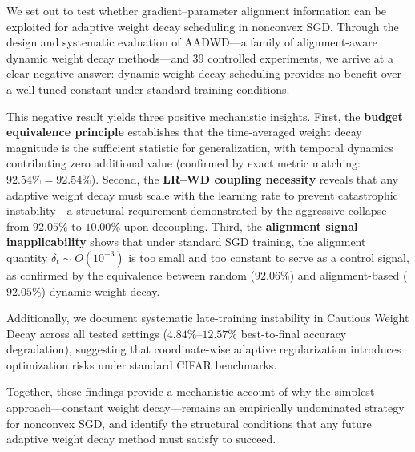 \documentclass{article}
\begin{document}
We set out to test whether gradient--parameter alignment information can be exploited
for adaptive weight decay scheduling in nonconvex SGD.
Through the design and systematic evaluation of AADWD---a family of alignment-aware
dynamic weight decay methods---and 39 controlled experiments, we arrive at a clear
negative answer: dynamic weight decay scheduling provides no benefit over a
well-tuned constant under standard training conditions.

This negative result yields three positive mechanistic insights.
First, the \textbf{budget equivalence principle} establishes that the time-averaged
weight decay magnitude is the sufficient statistic for generalization, with temporal
dynamics contributing zero additional value (confirmed by exact metric matching:
$92.54\% = 92.54\%$).
Second, the \textbf{LR--WD coupling necessity} reveals that any adaptive weight decay
must scale with the learning rate to prevent catastrophic instability---a structural
requirement demonstrated by the aggressive collapse from $92.05\%$ to $10.00\%$ upon
decoupling.
Third, the \textbf{alignment signal inapplicability} shows that under standard SGD
training, the alignment quantity $\delta_t \sim O(10^{-3})$ is too small and too
constant to serve as a control signal, as confirmed by the equivalence between random
($92.06\%$) and alignment-based ($92.05\%$) dynamic weight decay.

Additionally, we document systematic late-training instability in Cautious Weight
Decay \citep{liu2025cautious} across all tested settings
($4.84\%$--$12.57\%$ best-to-final accuracy degradation), suggesting that
coordinate-wise adaptive regularization introduces optimization risks under standard
CIFAR benchmarks.

Together, these findings provide a mechanistic account of why the simplest
approach---constant weight decay---remains an empirically undominated strategy for
nonconvex SGD, and identify the structural conditions that any future adaptive weight
decay method must satisfy to succeed.



\end{document}
